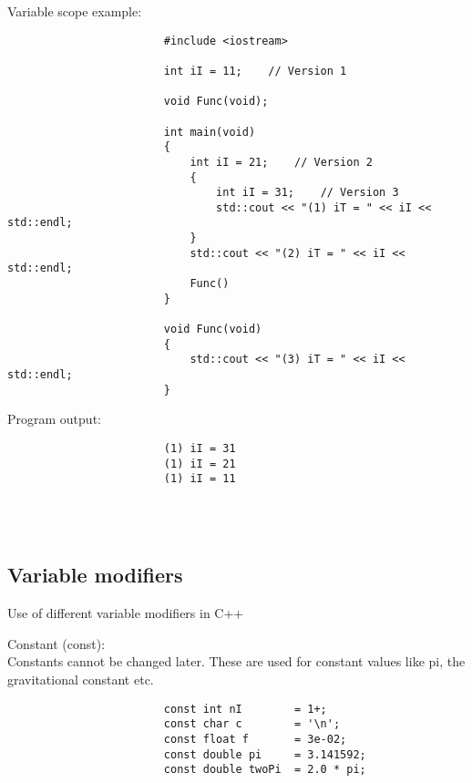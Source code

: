 \documentclass{report}
\begin{document}
				\begin{minipage}{\linewidth}
					Variable scope example:
					\begin{lstlisting}
						#include <iostream>
						
						int iI = 11;	// Version 1
						
						void Func(void);
						
						int main(void)
						{
							int iI = 21;	// Version 2
							{
								int iI = 31;	// Version 3
								std::cout << "(1) iT = " << iI << std::endl;
							}
							std::cout << "(2) iT = " << iI << std::endl;
							Func()
						}
						
						void Func(void)
						{
							std::cout << "(3) iT = " << iI << std::endl;
						}
					\end{lstlisting}
				\end{minipage}
				
				\begin{minipage}{\linewidth}
					Program output:
					\begin{lstlisting}
						(1) iI = 31
						(1) iI = 21
						(1) iI = 11
					\end{lstlisting}
				\end{minipage}
				\\ \\
			
			
			\subsection{Variable modifiers}
				Use of different variable modifiers in C++ \\
				
				\begin{minipage}{\linewidth}
					Constant (const): \\
					Constants cannot be changed later.
					These are used for constant values like pi, the gravitational constant etc.
					\begin{lstlisting}
						const int nI 		= 1+;
						const char c 		= '\n';
						const float f		= 3e-02;
						const double pi		= 3.141592;
						const double twoPi	= 2.0 * pi;
					\end{lstlisting} 
				\end{minipage}
				\\ \\
				
\end{document}
